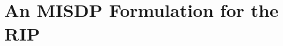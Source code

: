 \documentclass[journal]{IEEEtran}
\newcommand{\Norm}[2]{\lVert{#1}\rVert_{#2}}
\newcommand{\T}{^{\top}}
\begin{document}


\section{An MISDP Formulation for the RIP}
\label{sec:MISDP}
\end{document}
